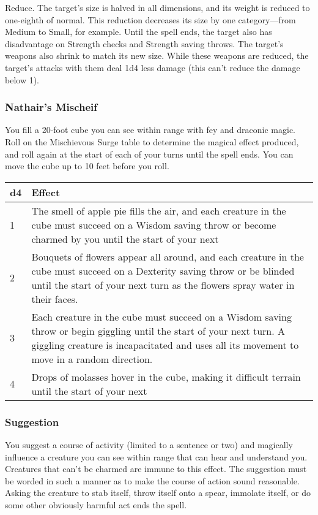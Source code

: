 \documentclass[11pt]{article}
\begin{document}
Reduce. The target's size is halved in all dimensions, and its weight is reduced to one-eighth of normal. This reduction decreases its size by one category—from Medium to Small, for example. Until the spell ends, the target also has disadvantage on Strength checks and Strength saving throws. The target's weapons also shrink to match its new size. While these weapons are reduced, the target's attacks with them deal 1d4 less damage (this can't reduce the damage below 1).
\subsubsection{Nathair's Mischeif}
\label{sec:orgec5dd7b}

You fill a 20-foot cube you can see within range with fey and draconic magic. Roll on the Mischievous Surge table to determine the magical effect produced, and roll again at the start of each of your turns until the spell ends. You can move the cube up to 10 feet before you roll.

\begin{center}
\begin{tabular}{|l|p{15cm}|}
\hline
d4 & Effect\\
\hline
1 & The smell of apple pie fills the air, and each creature in the cube must succeed on a Wisdom saving throw or become charmed by you until the start of your next\\
\hline
2 & Bouquets of flowers appear all around, and each creature in the cube must succeed on a Dexterity saving throw or be blinded until the start of your next turn as the flowers spray water in their faces.\\
\hline
3 & Each creature in the cube must succeed on a Wisdom saving throw or begin giggling until the start of your next turn. A giggling creature is incapacitated and uses all its movement to move in a random direction.\\
\hline
4 & Drops of molasses hover in the cube, making it difficult terrain until the start of your next\\
\hline
\end{tabular}
\end{center}
\subsubsection{Suggestion}
\label{sec:orga379f03}
You suggest a course of activity (limited to a sentence or two) and magically influence a creature you can see within range that can hear and understand you. Creatures that can't be charmed are immune to this effect. The suggestion must be worded in such a manner as to make the course of action sound reasonable. Asking the creature to stab itself, throw itself onto a spear, immolate itself, or do some other obviously harmful act ends the spell.
\end{document}
